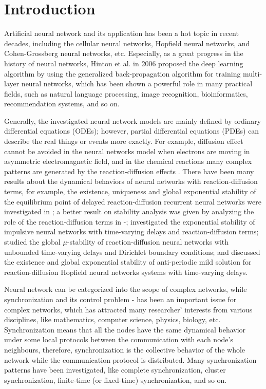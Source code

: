 \documentclass[review]{elsarticle}
\begin{document}
\section{Introduction}
Artificial neural network and its application has been a hot topic in recent decades, including the cellular neural networks, Hopfield neural networks, and Cohen-Grossberg neural networks, etc. Especially, as a great progress in the history of neural networks, Hinton et al. in 2006 proposed the deep learning algorithm \cite{H2006} by using the generalized back-propagation algorithm for training multi-layer neural networks, which has been shown a powerful role in many practical fields, such as natural language processing, image recognition, bioinformatics, recommendation systems, and so on.

Generally, the investigated neural network models are mainly defined by ordinary differential equations (ODEs); however, partial differential equations (PDEs) can describe the real things or events more exactly. For example, diffusion effect cannot be avoided in the neural networks model when electrons are moving in asymmetric electromagnetic field, and in the chemical reactions many complex patterns are generated by the reaction-diffusion effects \cite{Turing,AJB2011}. There have been many results about the dynamical behaviors of neural networks with reaction-diffusion terms, for example, the existence, uniqueness and global exponential stability of the equilibrium point of delayed reaction-diffusion recurrent neural networks were investigated in \cite{LC03}; a better result on stability analysis was given by analyzing the role of the reaction-diffusion terms in \cite{L07}-\cite{WL08}; \cite{Q2007} investigated the exponential stability of impulsive neural networks with time-varying delays and reaction-diffusion terms; \cite{CZ2011} studied the global $\mu$-stability of reaction-diffusion neural networks with unbounded time-varying delays and Dirichlet boundary conditions; and \cite{CFZ2013} discussed the existence and global exponential stability of anti-periodic mild solution for reaction-diffusion Hopfield neural networks systems with time-varying delays.

Neural network can be categorized into the scope of complex networks, while synchronization and its control problem \cite{WL95}-\cite{CLL07} has been an important issue for complex networks, which has attracted many researcher' interests from various disciplines, like mathematics, computer science, physics, biology, etc. Synchronization means that all the nodes have the same dynamical behavior under some local protocols between the communication with each node's neighbours, therefore, synchronization is the collective behavior of the whole network while the communication protocol is distributed. Many synchronization patterns have been investigated, like complete synchronization, cluster synchronization, finite-time (or fixed-time) synchronization, and so on.
\end{document}
